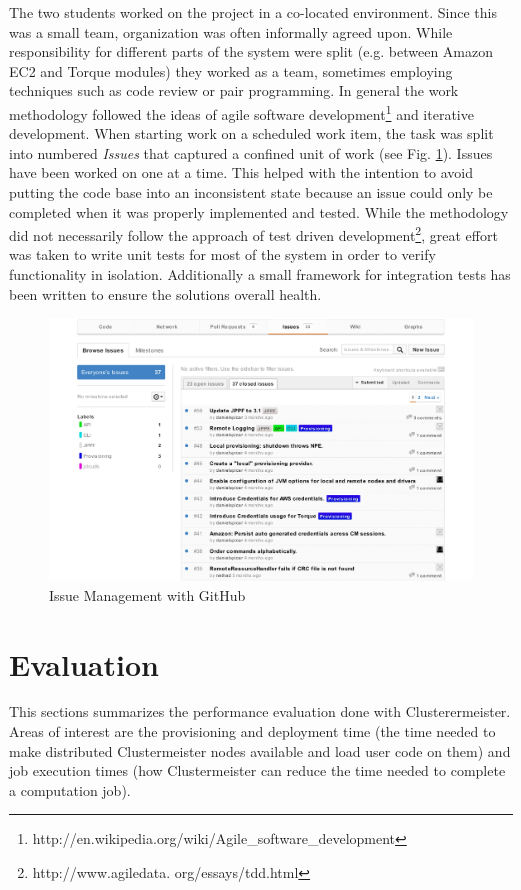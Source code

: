 \documentclass[12pt]{article}
\begin{document}
The two students worked on the project in a co-located environment. Since this was a small team, organization was often informally agreed upon. While responsibility for different parts of the system were split (e.g. between Amazon EC2 and Torque modules) they worked as a team, sometimes employing techniques such as code review or pair programming. In general the work methodology followed the ideas of agile software development\footnote{http://en.wikipedia.org/wiki/Agile\_software\_development} and iterative development. When starting work on a scheduled work item, the task was split into numbered \emph{Issues} that captured a confined unit of work (see Fig. \ref{fig:issues}). Issues have been worked on one at a time. This helped with the intention to avoid putting the code base into an inconsistent state because an issue could only be completed when it was properly implemented and tested. While the methodology did not necessarily follow the approach of test driven development\footnote{http://www.agiledata.
org/essays/tdd.html}, great effort was taken to write unit tests for most of the system in order 
to verify functionality in isolation. Additionally a small framework for integration tests has been written to ensure the solutions overall health.

\begin{figure}[hptb]
\centering
\includegraphics[scale=0.7]{images/github-issues.pdf}
\caption{Issue Management with GitHub}
\label{fig:issues}
\end{figure}

\section{Evaluation}
This sections summarizes the performance evaluation done with Clusterermeister. Areas of interest are the provisioning and deployment time (the time needed to make distributed Clustermeister nodes available and load user code on them) and job execution times (how Clustermeister can reduce the time needed to complete a computation job). 
\end{document}
